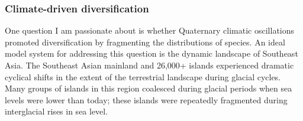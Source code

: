 
\subsubsection*{Climate-driven diversification}
One question I am passionate about is whether Quaternary climatic oscillations
promoted diversification by fragmenting the distributions of species.
An ideal model system for addressing this question is the dynamic landscape of
Southeast Asia.
The Southeast Asian mainland and 26,000+ islands experienced dramatic cyclical
shifts in the extent of the terrestrial landscape during glacial cycles.
Many groups of islands in this region coalesced during glacial periods when sea
levels were lower than today; these islands were repeatedly fragmented during
interglacial rises in sea level.


